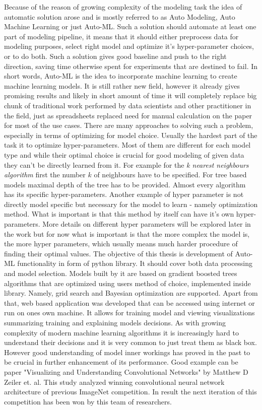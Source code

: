 \documentclass[a4paper,twoside,12pt]{book}
\begin{document}
\begin{itemize}
Because of the reason of growing complexity of the modeling task the idea of automatic solution arose and is mostly referred to as Auto Modeling, Auto Machine Learning or just Auto-ML. Such a solution should automate at least one part of modeling pipeline, it means that it should either preprocess data for modeling purposes, select right model and optimize it's hyper-parameter choices, or to do both.
Such a solution gives good baseline and push to the right direction, saving time otherwise spent for experiments that are destined to fail. In short words, Auto-ML is the idea to incorporate machine learning to create machine learning models. It is still rather new field, however it already gives promising results and likely in short amount of time it will completely replace big chunk of traditional work performed by data scientists and other practitioner in the field, just as spreadsheets replaced need for manual calculation on the paper for most of the use cases.
\newline
There are many approaches to solving such a problem, especially in terms of optimizing for model choice. 
Usually the hardest part of the task it to optimize hyper-parameters. Most of them are different for each model type and while their optimal choice is crucial for good modeling of given data they can't be directly learned from it. For example for the \emph{k nearest neighbours algorithm} first the number $k$ of neighbours have to be specified. For tree based models maximal depth of the tree has to be provided. Almost every algorithm has its specific hyper-parameters. 
Another example of hyper parameter is not directly model specific but necessary for the model to learn - namely optimization method. What is important is that this method by itself can have it's own hyper-parameters. More details on different hyper parameters will be explored later in the work but for now what is important is that the more complex the model is, the more hyper parameters, which usually means much harder procedure of finding their optimal values.
\newline
The objective of this thesis is development of Auto-ML functionality in form of python library. It should cover both data processing and model selection. Models built by it are based on gradient boosted trees algorithms that are optimized using users method of choice, implemented inside library. Namely, grid search and Bayesian optimization are supported. Apart from that, web based application was developed that can be accessed using internet or run on ones own machine. It allows for training model and viewing visualizations summarizing training and explaining models decisions. As with growing complexity of modern machine learning algorithms it is increasingly hard to understand their decisions and it is very common to just treat them as black box. However good understanding of model inner workings has proved in the past to be crucial in further enhancement of its performance. Good example can be paper "Visualizing and Understanding Convolutional Networks"\cite{VisNeuralNet} by Matthew D Zeiler et. al. This study analyzed winning convolutional neural network architecture of previous ImageNet competition. In result the next iteration of this competition has been won by this team of researchers.

\end{itemize}
\end{document}

